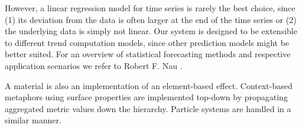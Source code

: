 However, a linear regression model for time series is rarely the best choice, since 
(1) its deviation from the data is often larger at the end of the time series or 
(2) the underlying data is simply not linear. 
Our system is designed to be extensible to different trend computation models, since other prediction models might be better suited.
For an overview of statistical forecasting methods and respective application scenarios we refer to Robert F. Nau \cite{Nau2015}.

A material is also an implementation of an element-based effect. 
Context-based metaphors using surface properties are implemented top-down by propagating aggregated metric values down the hierarchy. 
Particle systems are handled in a similar manner.
